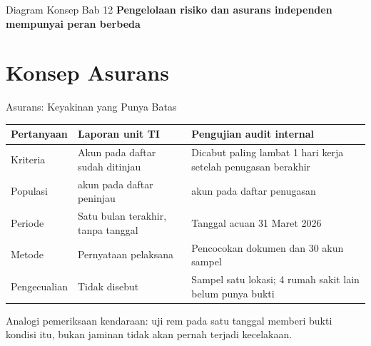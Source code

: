 \documentclass[aspectratio=169, table, 12pt]{beamer}
\begin{document}
\begin{frame}{{\Large Diagram Konsep Bab 12}}
  \centering
  {\small\bfseries Pengelolaan risiko dan asurans independen mempunyai peran berbeda}\par\medskip
  \label{fig:session12-ilustrasi-bab}
\end{frame}

\section{Konsep Asurans}

\begin{frame}{{\Large Asurans: Keyakinan yang Punya Batas}}
  \vspace{4pt}
  \scriptsize
  \begin{tabularx}{\textwidth}{|>{\raggedright\arraybackslash}p{}|>{\raggedright\arraybackslash}X|>{\raggedright\arraybackslash}X|}
    \hline
    \textbf{Pertanyaan} & \textbf{Laporan unit TI} & \textbf{Pengujian audit internal} \\ \hline
    Kriteria & Akun pada daftar sudah ditinjau & Dicabut paling lambat 1 hari kerja setelah
    penugasan berakhir \\ \hline
    Populasi & 108 akun pada daftar peninjau & 120 akun pada daftar penugasan \\ \hline
    Periode & Satu bulan terakhir, tanpa tanggal & Tanggal acuan 31 Maret 2026 \\ \hline
    Metode & Pernyataan pelaksana & Pencocokan dokumen dan 30 akun sampel \\ \hline
    Pengecualian & Tidak disebut & Sampel satu lokasi; 4 rumah sakit lain belum punya bukti \\
    \hline
  \end{tabularx}

  \vspace{8pt}
  \small Analogi pemeriksaan kendaraan: uji rem pada satu tanggal memberi bukti kondisi itu, bukan
  jaminan tidak akan pernah terjadi kecelakaan.
\end{frame}
\end{document}
